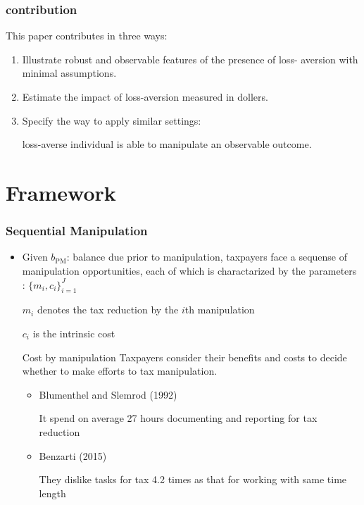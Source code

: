 \documentclass[dvipdfmx,12pt]{beamer}
\begin{document}
\begin{frame}
\end{frame}

\begin{frame}\frametitle{contribution}
  This paper contributes in three ways:

  \begin{enumerate}
    \item Illustrate robust and observable features of the presence of loss-
    aversion with minimal assumptions.

    \item Estimate the impact of loss-aversion measured in dollers.

    \item Specify the way to apply similar settings:

    loss-averse individual is able to manipulate an observable outcome.
  \end{enumerate}
\end{frame}

\section{Framework}
\begin{frame}\frametitle{Sequential Manipulation}
  \begin{itemize}

    \item Given $b_{\text{PM}}$: balance due prior to manipulation,
    taxpayers face a sequense of manipulation opportunities,
    each of which is charactarized by the parameters
    : $\{ m_i, c_i \} _{i=1} ^{J}$

    $m_i$ denotes the tax reduction by the $i$th manipulation

    $c_i$ is the intrinsic cost

    \begin{block}{Cost by manipulation}
      \footnotesize
      Taxpayers consider their benefits and costs to decide whether to
      make efforts to tax manipulation.

      \begin{itemize}
        \scriptsize
        \item Blumenthel and Slemrod (1992)

        It spend on average 27 hours documenting and reporting for tax
        reduction

        \item Benzarti (2015)

        They dislike tasks for tax 4.2 times as that for working with
        same time length
      \end{itemize}

    \end{block}
  \end{itemize}
\end{frame}
\end{document}
